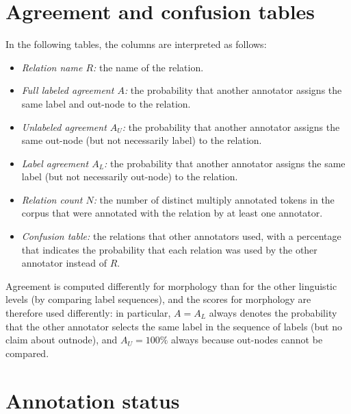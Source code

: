 \documentclass[11pt]{report}
\def\rel#1{\textsf{#1\index{#1}}}
\begin{document}
	\renewenvironment{overview}[1]{\begin{center}\def\mycaption{#1}\begin{longtable}{|p{120mm}|}\hline}{\\ \hline\end{longtable}\nopagebreak\medskip\nopagebreak\par\nopagebreak{The relations matching \rel{\small\mycaption}.}\end{center}\bigskip}

	

	\chapter{Agreement and confusion tables}

	In the following tables, the columns are interpreted as follows:
	\begin{itemize}
		\item \textit{Relation name $R$:} the name of the relation.
		\item \textit{Full labeled agreement $A$:} the probability that
			another annotator assigns the same label and out-node to
			the relation.
		\item \textit{Unlabeled agreement $A_U$:} the probability that
			another annotator assigns the same out-node (but not
			necessarily label) to the relation.
		\item \textit{Label agreement $A_L$:} the probability that
			another annotator assigns the same label (but not
			necessarily out-node) to
			the relation.
		\item \textit{Relation count $N$:} the number of distinct
			multiply annotated tokens in the corpus that were
			annotated with the relation by at least one annotator.
		\item \textit{Confusion table:} the relations that other
			annotators used, with a percentage that indicates the
			probability that each relation was used by the other annotator 
			instead of $R$.
	\end{itemize}
	Agreement is computed differently for morphology than for the
	other linguistic levels (by comparing label sequences), and the
	scores for morphology are therefore used differently: in
	particular, $A=A_L$ always denotes the probability that the other
	annotator selects the same label in the sequence of labels (but no
	claim about outnode), and $A_U=100\%$ always because out-nodes
	cannot be compared. 
	
	
	
	
	
	
	
	

	\chapter{Annotation status}

	

	\printindex
\end{document}
